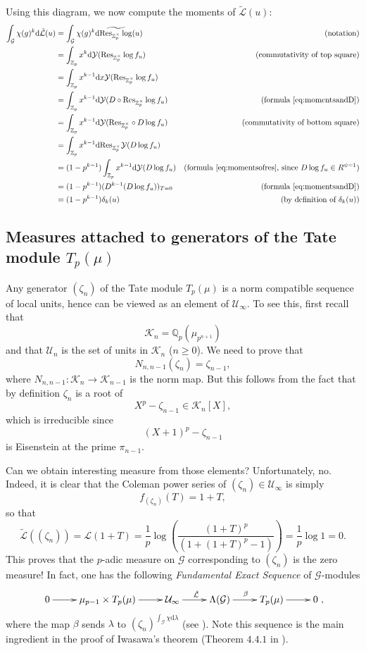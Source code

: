\documentclass[twoside,10pt]{article}
\newcommand{\rarr}{\rightarrow}
\newcommand{\Z}{\mathbb{Z}}
\newcommand{\Q}{\mathbb{Q}}
\newcommand{\curlG}{\mathcal{G}}
\newcommand{\curlY}{\mathcal{Y}}
\newcommand{\curlU}{\mathcal{U}}
\newcommand{\curlK}{\mathcal{K}}
\newcommand{\curlL}{\mathcal{L}}
\renewcommand{\d}{\text{d}}
\newcommand{\Res}{\text{Res}_{\Z_p^\times}}
\begin{document}
Using this diagram, we now compute the moments of $\tilde{\curlL}(u)$:
\begin{align*}
	\int_{\curlG}\chi(g)^k\d\tilde{\curlL}(u) 	&= \int_{\curlG}\chi(g)^k\d\widetilde{\Res\log}(u) 	&\text{(notation)}\\
												&= \int_{\Z_p}x^k\d\curlY(\Res\log f_u)				&\text{(commutativity of top square)}\\
												&= \int_{\Z_p}x^{k-1}\d x\curlY(\Res\log f_u)		&\\
												&= \int_{\Z_p}x^{k-1}\d \curlY(D\circ\Res\log f_u)	&\text{(formula \ref{eq:momentsandD})}\\
												&= \int_{\Z_p}x^{k-1}\d \curlY(\Res\circ D\log f_u)	&\text{(commutativity of bottom square)}\\
												&= \int_{\Z_p}x^{k-1}\d \Res\curlY(D\log f_u)		&\\
												&= (1-p^{k-1})\int_{\Z_p}x^{k-1}\d \curlY(D\log f_u)&\text{(formula \ref{eq:momentsofres}, since $D\log f_u\in R^{\psi=1}$)}\\
												&= (1-p^{k-1})(D^{k-1}(D\log f_u))_{T=0}			&\text{(formula \ref{eq:momentsandD})}\\
												&= (1-p^{k-1})\delta_k(u)							&\text{(by definition of $\delta_k(u)$)}\\
\end{align*}


\subsection{Measures attached to generators of the Tate module $T_p(\mu)$}
Any generator $(\zeta_n)$ of the Tate module $T_p(\mu)$ is a norm compatible sequence of local units, hence can be viewed as an element of $\curlU_\infty$. To see this, first recall that
\[\curlK_n=\Q_p(\mu_{p^{n+1}})\]
and that $\curlU_n$ is the set of units in $\curlK_n$ ($n\geq 0$). We need to prove that
\[N_{n,n-1}(\zeta_n)=\zeta_{n-1},\]
where $N_{n,n-1}:\curlK_n\rarr\curlK_{n-1}$ is the norm map. But this follows from the fact that by definition $\zeta_n$ is a root of
\[X^p-\zeta_{n-1}\in\curlK_n[X],\]
which is irreducible since
\[(X+1)^p-\zeta_{n-1}\]
is Eisenstein at the prime $\pi_{n-1}$.

Can we obtain interesting measure from those elements? Unfortunately, no. Indeed, it is clear that the Coleman power series of $(\zeta_n)\in\curlU_\infty$ is simply
\[f_{(\zeta_n)}(T)=1+T,\]
so that
\[\tilde{\curlL}((\zeta_n))=\curlL(1+T)=\frac{1}{p}\log\left (\frac{(1+T)^p}{(1+(1+T)^p-1)}\right )=\frac{1}{p}\log 1=0.\]
This proves that the $p$-adic measure on $\curlG$ corresponding to $(\zeta_n)$ is the zero measure! In fact, one has the following \emph{Fundamental Exact Sequence} of $\curlG$-modules
\[\xymatrix{
	0\ar[r]	&\mu_{p-1}\times T_p(\mu)\ar[r]	&\curlU_\infty\ar[r]^{\tilde{\curlL}}	&\Lambda(\curlG)\ar[r]^\beta	&T_p(\mu)\ar[r]	&0
},\]
where the map $\beta$ sends $\lambda$ to $(\zeta_n)^{\int_\curlG\chi\d\lambda}$ (see \cite[Theorem 3.5.1]{CS}). Note this sequence is the main ingredient in the proof of Iwasawa's theorem (Theorem $4.4.1$ in \cite{CS}).
\end{document}
